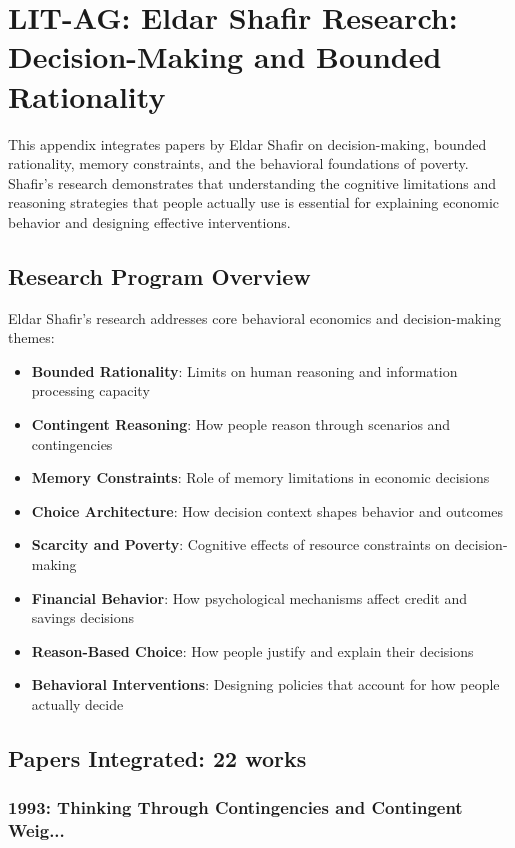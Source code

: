 
\section{LIT-AG: Eldar Shafir Research: Decision-Making and Bounded Rationality}
\label{app:litag}

This appendix integrates papers by Eldar Shafir on decision-making, bounded rationality, memory constraints, and the behavioral foundations of poverty. Shafir's research demonstrates that understanding the cognitive limitations and reasoning strategies that people actually use is essential for explaining economic behavior and designing effective interventions.

\subsection{Research Program Overview}

Eldar Shafir's research addresses core behavioral economics and decision-making themes:

\begin{itemize}
  \item \textbf{Bounded Rationality}: Limits on human reasoning and information processing capacity
  \item \textbf{Contingent Reasoning}: How people reason through scenarios and contingencies
  \item \textbf{Memory Constraints}: Role of memory limitations in economic decisions
  \item \textbf{Choice Architecture}: How decision context shapes behavior and outcomes
  \item \textbf{Scarcity and Poverty}: Cognitive effects of resource constraints on decision-making
  \item \textbf{Financial Behavior}: How psychological mechanisms affect credit and savings decisions
  \item \textbf{Reason-Based Choice}: How people justify and explain their decisions
  \item \textbf{Behavioral Interventions}: Designing policies that account for how people actually decide
\end{itemize}

\subsection{Papers Integrated: 22 works}


\subsubsection{1993: Thinking Through Contingencies and Contingent Weig...}

